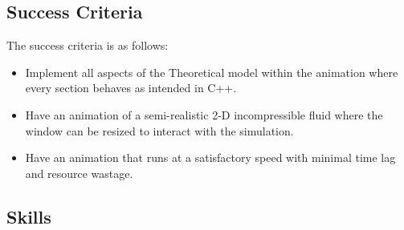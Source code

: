 \documentclass[write-up.tex]{subfiles}
\begin{document}
\subsection{Success Criteria}
The success criteria is as follows:
\begin{itemize}
 \item Implement all aspects of the Theoretical model within the animation where every section behaves as intended in C++.
 \item Have an animation of a semi-realistic 2-D incompressible fluid where the window can be resized to interact with the simulation.
 \item Have an animation that runs at a satisfactory speed with minimal time lag and resource wastage.
\end{itemize}
\subsection{Skills}
\vfill
\end{document}
